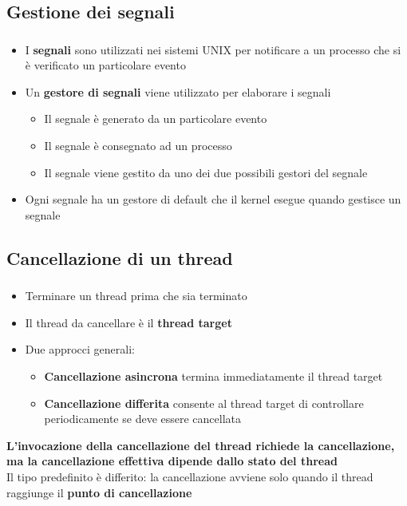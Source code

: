 \documentclass{beamer}
\newenvironment{mainframe}{
	\begin{frame}
		\frametitle{\insertsubsection}
		\framesubtitle{\insertsection}
	}{
	\end{frame}
}
\begin{document}
\subsection{Gestione dei segnali}
\begin{mainframe}
	\begin{itemize}
		\item I \textbf{segnali} sono utilizzati nei sistemi UNIX per notificare a un processo che si è verificato un particolare evento
		\item Un \textbf{gestore di segnali} viene utilizzato per elaborare i segnali
		\begin{itemize}
			\item Il segnale è generato da un particolare evento
			\item Il segnale è consegnato ad un processo
			\item Il segnale viene gestito da uno dei due possibili gestori del segnale
		\end{itemize}
		\item Ogni segnale ha un gestore di default che il kernel esegue quando gestisce un segnale
	\end{itemize}
\end{mainframe}
\subsection{Cancellazione di un thread}
\begin{mainframe}
	\begin{itemize}
		\item Terminare un thread prima che sia terminato
		\item Il thread da cancellare è il \textbf{thread target}
		\item Due approcci generali:
		\begin{itemize}
			\item \textbf{Cancellazione asincrona} termina immediatamente il thread target
			\item \textbf{Cancellazione differita} consente al thread target di controllare periodicamente se deve essere cancellata
		\end{itemize}
	\end{itemize}
\textbf{	L'invocazione della cancellazione del thread richiede la cancellazione, ma la cancellazione effettiva dipende dallo stato del thread}\\
Il tipo predefinito è differito: la cancellazione avviene solo quando il thread raggiunge il \textbf{punto di cancellazione}
\end{mainframe}
\end{document}
